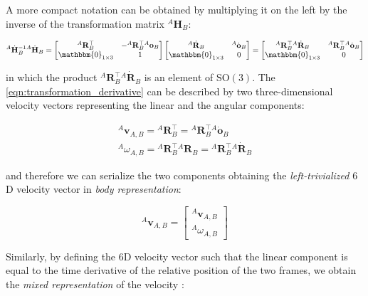 A more compact notation can be obtained by multiplying it on the left by the inverse of the transformation matrix ${}^A\mathbf{H} _B$:

\begin{equation}
    {}^A\dot{\mathbf{H}} _B ^{-1} {}^A\dot{\mathbf{H}} _B =
    \begin{bmatrix}
        {}^A\mathbf{R}_B^\top     & -{}^A\mathbf{R}_B^\top {}^A\mathbf{o}_B \\
        \mathbbm{0} _{1 \times 3} & 1
    \end{bmatrix}
    \begin{bmatrix}
        {}^A\dot{\mathbf{R}}_B    & {}^A\dot{\mathbf{o}}_B \\
        \mathbbm{0} _{1 \times 3} & 0
    \end{bmatrix} =
    \begin{bmatrix}
        {}^A\mathbf{R}_B^\top {}^A\dot{\mathbf{R}}_B & {}^A\mathbf{R}_B^\top {}^A\dot{\mathbf{o}}_B \\
        \mathbbm{0} _{1 \times 3}                    & 0
    \end{bmatrix}
\end{equation}

in which the product ${}^A\mathbf{R}_B^\top {}^A\dot{\mathbf{R}}_B$ is an element of $\mathrm{SO}(3)$. The \cref{eqn:transformation_derivative} can be described by two three-dimensional velocity vectors representing the linear and the angular components:

\begin{align}
    {}^A\mathbf{v}_{A,B} = {}^A\mathbf{R}_B^\top = {}^A\mathbf{R}_B^\top {}^A\dot{\mathbf{o}}_B \\
    {}^A\omega_{A,B} = {}^A\mathbf{R}_B^\top {}^A\mathbf{R}_B = {}^A\mathbf{R}_B^\top {}^A\dot{\mathbf{R}}_B
\end{align}

and therefore we can serialize the two components obtaining the \textit{left-trivialized} $6$D velocity vector in \textit{body representation}:

\begin{equation}
    \label{eqn:left_trivialized}
    {}^A\mathbf{v}_{A,B} = \begin{bmatrix}
        {}^A\mathbf{v}_{A,B} \\
        {}^A\omega_{A,B}
    \end{bmatrix}
\end{equation}

Similarly, by defining the $6$D velocity vector such that the linear component is equal to the time derivative of the relative position of the two frames, we obtain the \textit{mixed representation} of the velocity \citep{traversaro_modelling_2019}:

